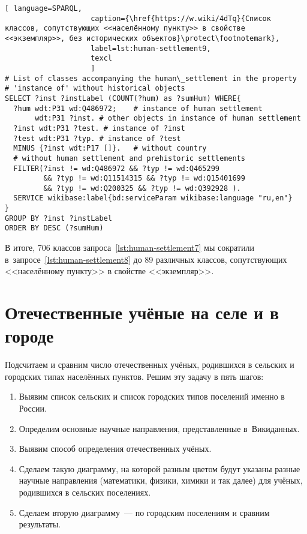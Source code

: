 \lstset{numbers=left, firstnumber=1, frame=single}
\begin{lstlisting}[ language=SPARQL, 
                    caption={\href{https://w.wiki/4dTq}{Cписок классов, сопутствующих <<населённому пункту>> в свойстве <<экземпляр>>, без исторических объектов}\protect\footnotemark},
                    label=lst:human-settlement9,
                    texcl 
                    ]
# List of classes accompanying the human\_settlement in the property
# 'instance of' without historical objects 
SELECT ?inst ?instLabel (COUNT(?hum) as ?sumHum) WHERE{
  ?hum wdt:P31 wd:Q486972;    # instance of human settlement
       wdt:P31 ?inst. # other objects in instance of human settlement
  ?inst wdt:P31 ?test. # instance of ?inst
  ?test wdt:P31 ?typ. # instance of ?test
  MINUS {?inst wdt:P17 []}.   # without country
  # without human settlement and prehistoric settlements
  FILTER(?inst != wd:Q486972 && ?typ != wd:Q465299 
         && ?typ != wd:Q11514315 && ?typ != wd:Q15401699 
         && ?typ != wd:Q200325 && ?typ != wd:Q392928 ). 
  SERVICE wikibase:label{bd:serviceParam wikibase:language "ru,en"}
}
GROUP BY ?inst ?instLabel
ORDER BY DESC (?sumHum)
\end{lstlisting}%

В итоге, 706 классов запроса~\ref{lst:human-settlement7} 
мы сократили в~запросе~\ref{lst:human-settlement8} 
до 89 различных классов, сопутствующих <<населённому пункту>> в свойстве <<экземпляр>>. 



\section{Отечественные учёные на селе и в городе}

Подсчитаем и сравним число отечественных учёных, родившихся в сельских и городских типах населённых пунктов. 
Решим эту задачу в пять шагов:
\begin{enumerate}
  \item Выявим список сельских и список городских типов поселений именно в России.
  \item Определим основные научные направления, представленные в~Викиданных.
  \item Выявим способ определения отечественных учёных.
  \item Сделаем такую диаграмму, на которой разным цветом будут указаны разные научные направления (математики, физики, химики и так далее) для учёных, родившихся в сельских поселениях.
  \item Сделаем вторую диаграмму~--- по городским поселениям и сравним результаты.
\end{enumerate}


